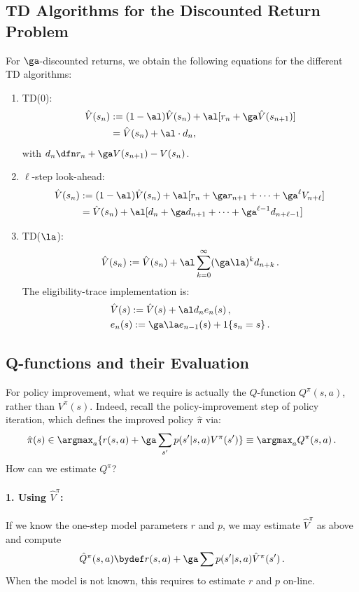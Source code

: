 \subsection{TD Algorithms for the Discounted Return Problem}

For $\ga$-discounted returns, we obtain the following equations for the
different TD algorithms:
\begin{enumerate}
  \item TD(0):
\begin{align*}
\hat V(s_n) & := (1-\al) \hat V(s_n) + \al [ r_n +
\ga\hat V (s_{n+1})] \\
& = \hat V (s_n) + \al \cdot d_n,
\end{align*}
with $d_n \dfn r_n + \ga V (s_{n+1}) - V(s_n)$.

  \item $\ell$-step look-ahead:
\begin{align*}
\hat V(s_n) & := (1-\al) \hat V(s_n) + \al [r_n + \ga r_{n+1}
+ \cdots + \ga^\ell V_{n+\ell}] \\
& = \hat V(s_n) + \al [d_n + \ga d_{n+1} + \cdots +
\ga^{\ell-1} d_{n+\ell-1}]
\end{align*}
  \item TD($\la$):
$$
\hat V(s_n) := \hat V (s_n) + \al \sum_{k=0}^\infty (\ga \la )^k
d_{n+k}\,.
$$
The eligibility-trace implementation is:
\begin{align*}
& \hat V(s) := \hat V(s) + \al d_n e_n (s) \,, \\
& e_n(s) := \ga\la e_{n-1}(s) +1\{s_n=s\} \,.
\end{align*}
\end{enumerate}

\subsection{Q-functions and their Evaluation}\label{ss:Q_eval}

For policy improvement, what we require is actually the
$Q$-function $Q^{\pi}(s,a)$, rather than $V^{\pi}(s)$.
Indeed, recall the policy-improvement step of policy iteration, which defines
the improved policy $\hat\pi$ via:
$$
\hat \pi(s) \in \argmax_a \{r(s,a) + \ga \sum_{s'} p(s'|s,a) V^{\pi} (s') \}
 \equiv \argmax_a Q^{\pi}(s,a)\,.
$$
How can we estimate $Q^{\pi}$?

\paragraph{1. Using $\hat V^{\pi}$:}
If we know the one-step model parameters $r$ and $p$,
we may estimate $\hat V^{\pi}$ as above and compute
$$
\hat Q^{\pi} (s,a) \bydef r(s,a) +\ga \sum p(s'|s,a) \hat V^{\pi}(s')\,.
$$
When the model is not known, this requires to estimate $r$ and $p$ on-line.

